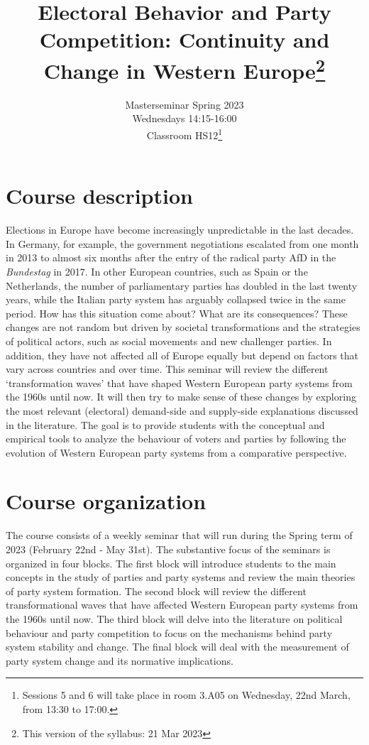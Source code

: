\documentclass[
  12pt,
]{article}
\title{Electoral Behavior and Party Competition: Continuity and Change
in Western Europe\footnote{This version of the syllabus: 21 Mar 2023}\\
\vspace{15truemm}}
\subtitle{Masterseminar Spring 2023\\
Wednesdays 14:15-16:00\\
Classroom HS12\footnote{Sessions 5 and 6 will take place in room 3.A05
  on Wednesday, 22nd March, from 13:30 to 17:00.}}
\author{}
\date{\vspace{-2.5em}}
\begin{document}
\maketitle

\hypertarget{course-description}{%
\section{Course description}\label{course-description}}

Elections in Europe have become increasingly unpredictable in the last
decades. In Germany, for example, the government negotiations escalated
from one month in 2013 to almost six months after the entry of the
radical party AfD in the \emph{Bundestag} in 2017. In other European
countries, such as Spain or the Netherlands, the number of parliamentary
parties has doubled in the last twenty years, while the Italian party
system has arguably collapsed twice in the same period. How has this
situation come about? What are its consequences? These changes are not
random but driven by societal transformations and the strategies of
political actors, such as social movements and new challenger parties.
In addition, they have not affected all of Europe equally but depend on
factors that vary across countries and over time. This seminar will
review the different `transformation waves' that have shaped Western
European party systems from the 1960s until now. It will then try to
make sense of these changes by exploring the most relevant (electoral)
demand-side and supply-side explanations discussed in the literature.
The goal is to provide students with the conceptual and empirical tools
to analyze the behaviour of voters and parties by following the
evolution of Western European party systems from a comparative
perspective.

\hypertarget{course-organization}{%
\section{Course organization}\label{course-organization}}

The course consists of a weekly seminar that will run during the Spring
term of 2023 (February 22nd - May 31st). The substantive focus of the
seminars is organized in four blocks. The first block will introduce
students to the main concepts in the study of parties and party systems
and review the main theories of party system formation. The second block
will review the different transformational waves that have affected
Western European party systems from the 1960s until now. The third block
will delve into the literature on political behaviour and party
competition to focus on the mechanisms behind party system stability and
change. The final block will deal with the measurement of party system
change and its normative implications.
\end{document}
